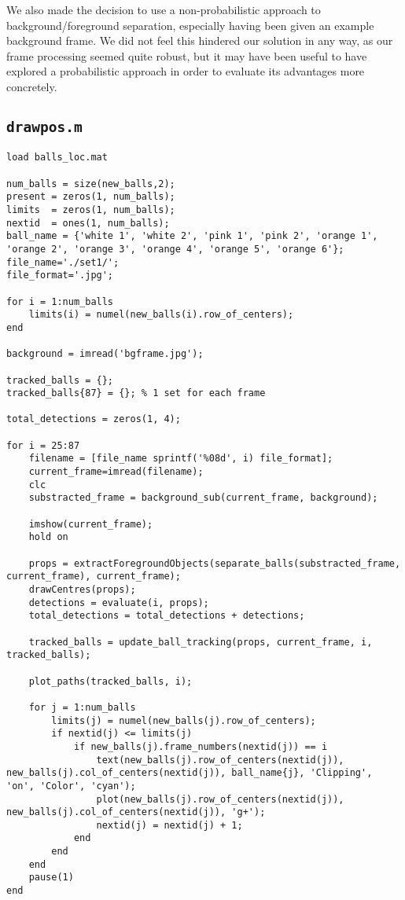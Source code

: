 \documentclass[12pt,a4paper]{article}
\begin{document}
We also made the decision to use a non-probabilistic approach to background/foreground separation, especially having been given an example background frame. We did not feel this hindered our solution in any way, as our frame processing seemed quite robust, but it may have been useful to have explored a probabilistic approach in order to evaluate its advantages more concretely. 


\begin{appendices}
\chapter{\texttt{drawpos.m}}
\begin{verbatim}
load balls_loc.mat

num_balls = size(new_balls,2);
present = zeros(1, num_balls);
limits  = zeros(1, num_balls);
nextid  = ones(1, num_balls);
ball_name = {'white 1', 'white 2', 'pink 1', 'pink 2', 'orange 1', 'orange 2', 'orange 3', 'orange 4', 'orange 5', 'orange 6'};
file_name='./set1/';
file_format='.jpg';

for i = 1:num_balls
	limits(i) = numel(new_balls(i).row_of_centers);
end

background = imread('bgframe.jpg');

tracked_balls = {};
tracked_balls{87} = {}; % 1 set for each frame

total_detections = zeros(1, 4);

for i = 25:87
	filename = [file_name sprintf('%08d', i) file_format];
	current_frame=imread(filename);
	clc
    substracted_frame = background_sub(current_frame, background);
    
    imshow(current_frame);
    hold on
       
    props = extractForegroundObjects(separate_balls(substracted_frame, current_frame), current_frame);
    drawCentres(props);
    detections = evaluate(i, props);
    total_detections = total_detections + detections;
    
    tracked_balls = update_ball_tracking(props, current_frame, i, tracked_balls);
    
    plot_paths(tracked_balls, i);
    
	for j = 1:num_balls
		limits(j) = numel(new_balls(j).row_of_centers);
		if nextid(j) <= limits(j)
			if new_balls(j).frame_numbers(nextid(j)) == i
				text(new_balls(j).row_of_centers(nextid(j)), new_balls(j).col_of_centers(nextid(j)), ball_name{j}, 'Clipping', 'on', 'Color', 'cyan');
				plot(new_balls(j).row_of_centers(nextid(j)), new_balls(j).col_of_centers(nextid(j)), 'g+');
				nextid(j) = nextid(j) + 1;
			end
        end
    end
	pause(1)
end


\end{verbatim}
\end{appendices}
\end{document}
